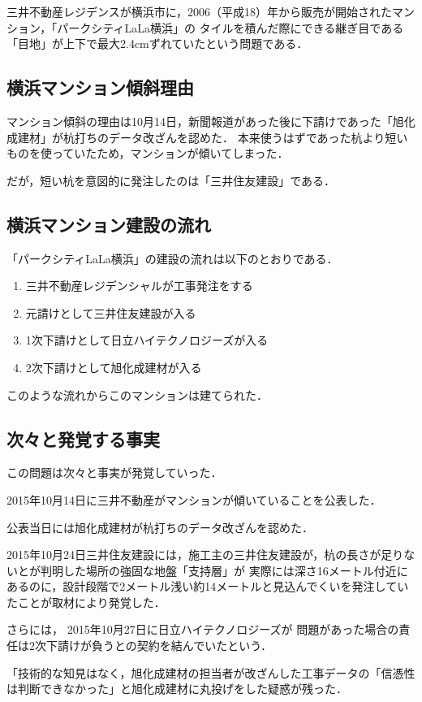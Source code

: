 {三井不動産レジデンスが横浜市に，2006（平成18）年から販売が開始されたマンション，「パークシティLaLa横浜」の
タイルを積んだ際にできる継ぎ目である「目地」が上下で最大2.4cmずれていたという問題である．



\subsection{横浜マンション傾斜理由}
マンション傾斜の理由は10月14日，新聞報道があった後に下請けであった「旭化成建材」が杭打ちのデータ改ざんを認めた．
本来使うはずであった杭より短いものを使っていたため，マンションが傾いてしまった．

だが，短い杭を意図的に発注したのは「三井住友建設」である．
\subsection{横浜マンション建設の流れ}
「パークシティLaLa横浜」の建設の流れは以下のとおりである．

\begin{enumerate}
  \item 三井不動産レジデンシャルが工事発注をする
  \item 元請けとして三井住友建設が入る
  \item 1次下請けとして日立ハイテクノロジーズが入る
  \item 2次下請けとして旭化成建材が入る
\end{enumerate}

このような流れからこのマンションは建てられた．

\subsection{次々と発覚する事実}
この問題は次々と事実が発覚していった．

2015年10月14日に三井不動産がマンションが傾いていることを公表した．

公表当日には旭化成建材が杭打ちのデータ改ざんを認めた．


2015年10月24日三井住友建設には，施工主の三井住友建設が，杭の長さが足りないとが判明した場所の強固な地盤「支持層」が
実際には深さ16メートル付近にあるのに，設計段階で2メートル浅い約14メートルと見込んでくいを発注していたことが取材により発覚した．

さらには，
2015年10月27日に日立ハイテクノロジーズが
問題があった場合の責任は2次下請けが負うとの契約を結んでいたという．

「技術的な知見はなく，旭化成建材の担当者が改ざんした工事データの「信憑性は判断できなかった」と旭化成建材に丸投げをした疑惑が残った．


}
